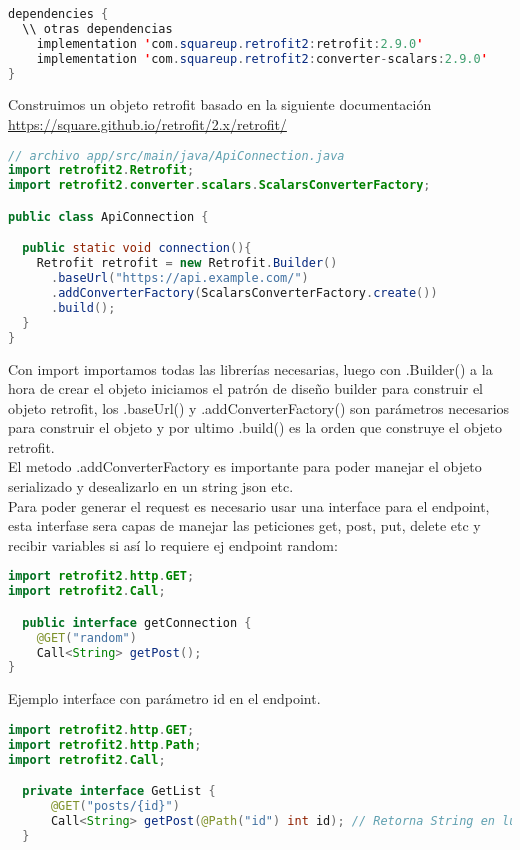 \begin{lstlisting}[language=java]
dependencies {
  \\ otras dependencias
    implementation 'com.squareup.retrofit2:retrofit:2.9.0'
    implementation 'com.squareup.retrofit2:converter-scalars:2.9.0'
}
\end{lstlisting}
Construimos un objeto retrofit basado en la siguiente documentación \url{https://square.github.io/retrofit/2.x/retrofit/}
\begin{lstlisting}[language=java]
// archivo app/src/main/java/ApiConnection.java
import retrofit2.Retrofit;
import retrofit2.converter.scalars.ScalarsConverterFactory;

public class ApiConnection {

  public static void connection(){
    Retrofit retrofit = new Retrofit.Builder()
      .baseUrl("https://api.example.com/")
      .addConverterFactory(ScalarsConverterFactory.create())
      .build();
  }
}
\end{lstlisting}
Con import importamos todas las librerías necesarias, luego con .Builder() a la hora de crear el objeto iniciamos el patrón de diseño builder para construir el objeto retrofit, los .baseUrl() y .addConverterFactory() son parámetros necesarios para construir el objeto y por ultimo .build() es la orden que construye el objeto retrofit.
\\
El metodo .addConverterFactory es importante para poder manejar el objeto serializado y desealizarlo en un string json etc.
\\
Para poder generar el request es necesario usar una interface para el endpoint, esta interfase sera capas de manejar las peticiones get, post, put, delete etc y recibir variables si así lo requiere ej endpoint random:
\begin{lstlisting}[language=java]
import retrofit2.http.GET;
import retrofit2.Call;

  public interface getConnection {
    @GET("random")
    Call<String> getPost();
}
\end{lstlisting}
Ejemplo interface con parámetro id en el endpoint.
\begin{lstlisting}[language=java]
import retrofit2.http.GET;
import retrofit2.http.Path;
import retrofit2.Call;

  private interface GetList {
      @GET("posts/{id}")
      Call<String> getPost(@Path("id") int id); // Retorna String en lugar de objeto
  }
\end{lstlisting}

